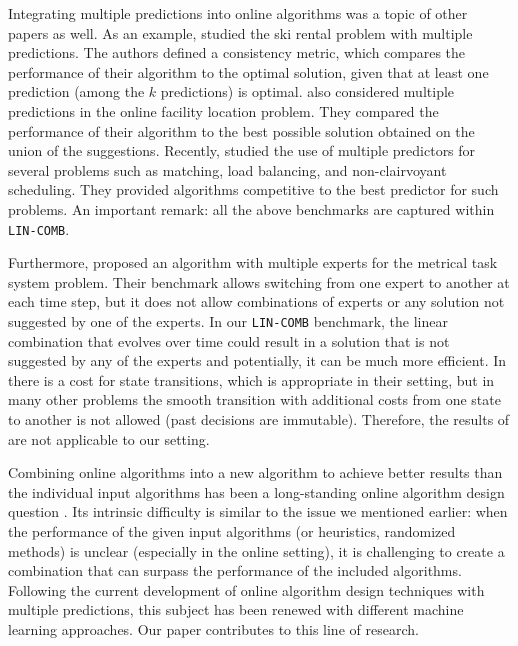 Integrating multiple predictions into online algorithms was a topic of other papers as well.
As an example, \cite{GollapudiPanigrahi19:skirental-multiple-predictions} studied the ski rental problem with multiple predictions.
The authors defined a consistency metric, which compares the performance of their algorithm to the optimal solution, given that at least one prediction (among the $k$ predictions) is optimal.
\cite{AlmanzaChierichetti21:Online-Facility} also considered multiple predictions in the online facility location problem.
They compared the performance of their algorithm to the best possible solution obtained on the union of the suggestions. Recently, \cite{DinitzIm:Algorithms-with} studied the use of multiple predictors for several problems such as matching, load balancing, and non-clairvoyant scheduling. They provided algorithms competitive to the best predictor for such problems.
An important remark: all the above benchmarks are captured within \texttt{LIN-COMB}.

Furthermore, \cite{AntoniosEtAll23:mixing-predictions-metric-algorithms} proposed an algorithm with multiple experts for the metrical task system problem. Their benchmark allows switching from one expert to another at each time step, but it does not allow combinations of experts or any solution not suggested by one of the experts. In our \texttt{LIN-COMB} benchmark, the linear combination that evolves over time could result in a solution that is not suggested by any of the experts and potentially, it can be much more efficient. In \cite{AntoniosEtAll23:mixing-predictions-metric-algorithms} there is a cost for state transitions, which is appropriate in their setting, but in many other problems the smooth transition with additional costs from one state to another is not allowed (past decisions are immutable). Therefore, the results of \cite{AntoniosEtAll23:mixing-predictions-metric-algorithms} are not applicable to our setting.

Combining online algorithms into a new algorithm to achieve better results than the individual input algorithms has been a long-standing online algorithm design question \cite{AzarBroder93:On-line-Choice,BlumBurch00:On-line-Learning}.
Its intrinsic difficulty is similar to the issue we mentioned earlier: when the performance of the given input algorithms (or heuristics, randomized methods) is unclear (especially in the online setting), it is challenging to create a combination that can surpass the performance of the included algorithms.
Following the current development of online algorithm design techniques with multiple predictions, this subject has been renewed with different machine learning approaches. Our paper contributes to this line of research.

